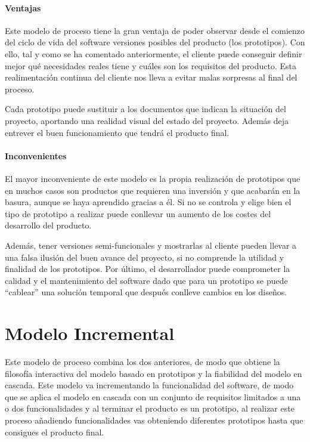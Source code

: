 \paragraph{Ventajas}

Este modelo de proceso tiene la gran ventaja de poder observar desde
el comienzo del ciclo de vida del software versiones posibles del
producto (los prototipos). Con ello, tal y como se ha comentado
anteriormente, el cliente puede conseguir definir mejor qué
necesidades reales tiene y cuáles son los requisitos del
producto. Esta realimentación continua del cliente nos lleva a evitar
malas sorpresas al final del proceso.

Cada prototipo puede sustituir a los documentos que indican la
situación del proyecto, aportando una realidad visual del estado del
proyecto. Además deja entrever el buen funcionamiento que tendrá el
producto final.

\paragraph{Inconvenientes}
El mayor inconveniente de este modelo es la propia realización de
prototipos que en muchos casos son productos que requieren una
inversión y que acabarán en la basura, aunque se haya aprendido
gracias a él. Si no se controla y elige bien el tipo de prototipo a
realizar puede conllevar un aumento de los costes del desarrollo del
producto.

Además, tener versiones semi-funcionales y mostrarlas al cliente
pueden llevar a una falsa ilusión del buen avance del proyecto, si no
comprende la utilidad y finalidad de los prototipos. Por último, el
desarrollador puede comprometer la calidad y el mantenimiento del
software dado que para un prototipo se puede ``cablear'' una solución
temporal que después conlleve cambios en los diseños.

\section{Modelo Incremental}
\label{sec:incremental}

Este modelo de proceso combina los dos anteriores, de modo que obtiene
la filosofía interactiva del modelo basado en prototipos y la
fiabilidad del modelo en cascada. Este modelo va incrementando la
funcionalidad del software, de modo que se aplica el modelo en cascada
con un conjunto de requisitos limitados a una o dos funcionalidades y
al terminar el producto es un prototipo, al realizar este proceso
añadiendo funcionalidades vas obteniendo diferentes prototipos hasta
que consigues el producto final.


